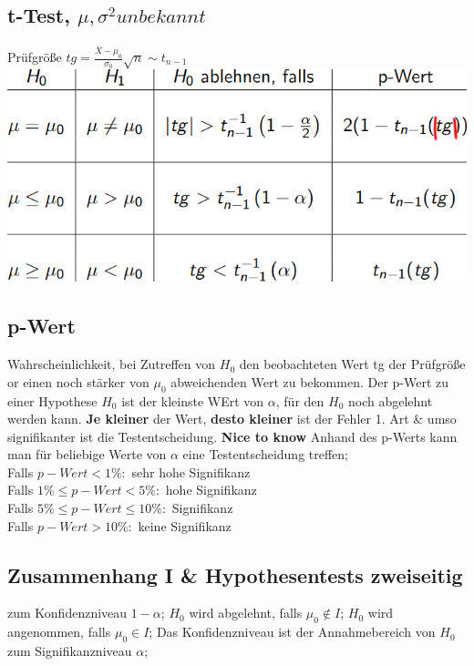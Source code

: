 \subsection{t-Test, $ \mu, \sigma^2 unbekannt  $}
Prüfgröße $ tg = \frac{ \overline{X} -\mu_{0} }{ \sigma_{0} } \sqrt{n} \sim t_{n-1} $
\includegraphics[scale=0.25]{./pic/tTest.png}
\subsection{p-Wert}
Wahrscheinlichkeit, bei Zutreffen von $ H_{0} $ den beobachteten Wert tg der Prüfgröße or einen noch stärker von $ \mu_{0} $ abweichenden Wert zu bekommen.
Der p-Wert zu einer Hypothese $ H_{0} $ ist der kleinste WErt von $ \alpha $, für den $ H_{0} $ noch abgelehnt werden kann. \textbf{Je kleiner} der Wert, \textbf{desto kleiner} ist der Fehler 1. Art \& umso signifikanter ist die Testentscheidung. 
\textbf{Nice to know} Anhand des p-Werts kann man für beliebige Werte von $ \alpha $ eine Testentscheidung treffen;\\
Falls $ p-Wert < 1\%:$ sehr hohe Signifikanz\\
Falls $ 1\% \le p-Wert < 5\%: $ hohe Signifikanz\\
Falls $ 5\% \le p-Wert \le 10\%: $ Signifikanz\\
Falls $ p-Wert > 10\%: $ keine Signifikanz\\
\subsection{Zusammenhang I \& Hypothesentests zweiseitig}
zum Konfidenzniveau $ 1- \alpha $; 
$ H_{0} $ wird abgelehnt, falls $ \mu_{0} \notin I $; 
$ H_{0} $ wird angenommen, falls $ \mu_{0} \in I $; 
Das Konfidenzniveau ist der Annahmebereich von $ H_{0} $ zum Signifikanzniveau $ \alpha $; 

